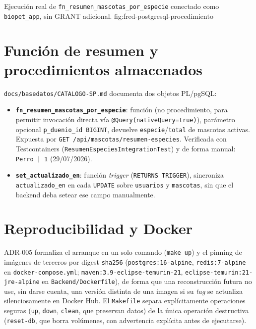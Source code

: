 %
{Ejecuci\'on real de \texttt{fn\_resumen\_mascotas\_por\_especie} conectado como \texttt{biopet\_app}, sin GRANT adicional.}%
{fig:fred-postgresql-procedimiento}

\section{Funci\'on de resumen y procedimientos almacenados}

\texttt{docs/basedatos/CATALOGO-SP.md} documenta dos objetos PL/pgSQL:

\begin{itemize}[nosep]
  \item \textbf{\texttt{fn_resumen_mascotas_por_especie}}: funci\'on (no
    procedimiento, para permitir invocaci\'on directa v\'ia
    \texttt{@Query(nativeQuery=true)}), par\'ametro opcional
    \texttt{p_duenio_id BIGINT}, devuelve \texttt{especie}/\texttt{total}
    de mascotas activas. Expuesta por
    \texttt{GET /api/mascotas/resumen-especies}. Verificada con
    Testcontainers (\texttt{ResumenEspeciesIntegrationTest}) y de forma
    manual: \texttt{Perro~|~1} (29/07/2026).
  \item \textbf{\texttt{set_actualizado_en}}: funci\'on \emph{trigger}
    (\texttt{RETURNS TRIGGER}), sincroniza \texttt{actualizado_en} en cada
    \texttt{UPDATE} sobre \texttt{usuarios} y \texttt{mascotas}, sin que el
    backend deba setear ese campo manualmente.
\end{itemize}

\section{Reproducibilidad y Docker}

ADR-005 formaliza el arranque en un solo comando (\texttt{make up}) y el
pinning de im\'agenes de terceros por digest \texttt{sha256}
(\texttt{postgres:16-alpine}, \texttt{redis:7-alpine} en
\texttt{docker-compose.yml}; \texttt{maven:3.9-eclipse-temurin-21},
\texttt{eclipse-temurin:21-jre-alpine} en \texttt{Backend/Dockerfile}), de
forma que una reconstrucci\'on futura no use, sin darse cuenta, una versi\'on
distinta de una imagen si su \emph{tag} se actualiza silenciosamente en
Docker Hub. El \texttt{Makefile} separa expl\'icitamente operaciones
seguras (\texttt{up}, \texttt{down}, \texttt{clean}, que preservan datos)
de la \'unica operaci\'on destructiva (\texttt{reset-db}, que borra
vol\'umenes, con advertencia expl\'icita antes de ejecutarse).

